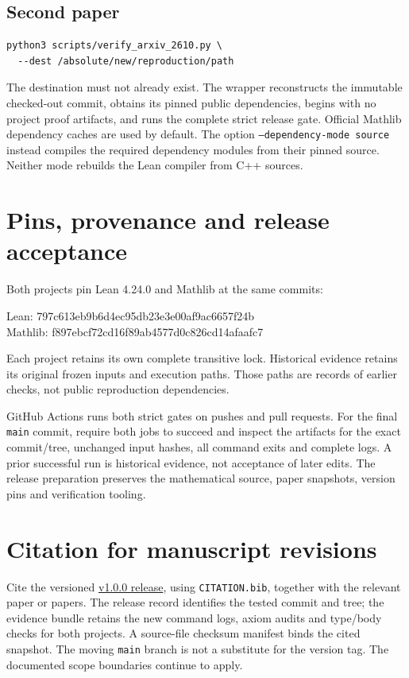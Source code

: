 \documentclass[10pt]{amsart}
\begin{document}
\subsection*{Second paper}
\begin{verbatim}
python3 scripts/verify_arxiv_2610.py \
  --dest /absolute/new/reproduction/path
\end{verbatim}
The destination must not already exist.
The wrapper reconstructs the immutable checked-out commit, obtains its pinned
public dependencies, begins with no project proof artifacts, and runs the
complete strict release gate.
Official Mathlib dependency caches are used by default.
The option \texttt{--dependency-mode source} instead compiles the required
dependency modules from their pinned source.
Neither mode rebuilds the Lean compiler from C++ sources.

\section{Pins, provenance and release acceptance}
Both projects pin Lean 4.24.0 and Mathlib at the same commits:
\begin{center}\footnotesize\ttfamily
Lean: 797c613eb9b6d4ec95db23e3e00af9ac6657f24b\\
Mathlib: f897ebcf72cd16f89ab4577d0c826cd14afaafc7
\end{center}
Each project retains its own complete transitive lock.
Historical evidence retains its original frozen inputs and execution paths.
Those paths are records of earlier checks, not public reproduction dependencies.

GitHub Actions runs both strict gates on pushes and pull requests.
For the final \texttt{main} commit, require both jobs to succeed and inspect
the artifacts for the exact commit/tree, unchanged input hashes,
all command exits and complete logs.
A prior successful run is historical evidence, not acceptance of later edits.
The release preparation preserves the mathematical source, paper snapshots,
version pins and verification tooling.

\section{Citation for manuscript revisions}
Cite the versioned
\href{https://github.com/Imine20/Lean-formalization-for-stabilizer-state-identification/releases/tag/v1.0.0}
{v1.0.0 release}, using \texttt{CITATION.bib}, together with the relevant
paper or papers. The release record identifies the tested commit and tree;
the evidence bundle retains the new command logs, axiom audits and type/body
checks for both projects. A source-file checksum manifest binds the cited
snapshot. The moving \texttt{main} branch is not a substitute for the
version tag. The documented scope boundaries continue to apply.
\end{document}
